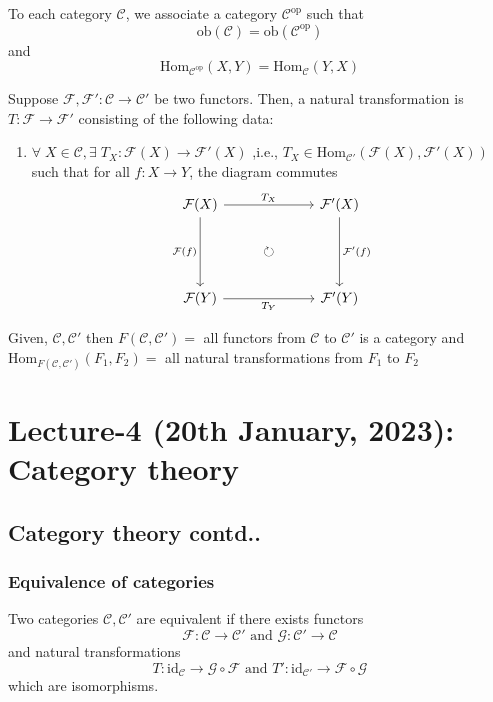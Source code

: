 \documentclass[oneside, 12pt]{scrbook}
\theoremstyle{theorem}
\begin{document}
To each category $\mathcal{C}$, we associate a category $\mathcal{C}^{\mathrm{op}}$ such that $$\mathrm{ob}(\mathcal{C}) = \mathrm{ob}(\mathcal{C}^{\mathrm{op}})$$ and $$\mathrm{Hom}_{\mathcal{C}^{\mathrm{op}}}(X,Y) = \mathrm{Hom}_{\mathcal{C}}(Y,X)$$

Suppose $\mathcal{F},\mathcal{F}' : \mathcal{C} \rightarrow \mathcal{C}'$ be two functors. Then, a natural transformation is $T: \mathcal{F} \rightarrow \mathcal{F}'$ consisting of the following data: 
\begin{enumerate}
\item $\forall \; X \in \mathcal{C} , \exists \; T_{X} : \mathcal{F}(X) \rightarrow \mathcal{F}'(X)$ ,i.e., $T_{X} \in \mathrm{Hom}_{\mathcal{C}'}(\mathcal{F}(X),\mathcal{F}' (X))$ such that for all $f: X \rightarrow Y$, the diagram commutes\[\begin{tikzcd}
	{\mathcal{F}(X)} & {} & {\mathcal{F}'(X)} \\
	{} & \circlearrowright & {} \\
	{\mathcal{F}(Y)} && {\mathcal{F}'(Y)}
	\arrow["{T_{X}}", from=1-1, to=1-3]
	\arrow["{\mathcal{F}(f)}"', from=1-1, to=3-1]
	\arrow["{\mathcal{F}'(f)}", from=1-3, to=3-3]
	\arrow["{T_{Y}}"', from=3-1, to=3-3]
\end{tikzcd}\]
\end{enumerate}

Given, $\mathcal{C}, \mathcal{C}'$ then $F(\mathcal{C}, \mathcal{C}')=$ all functors from $\mathcal{C}$ to $\mathcal{C}'$ is a category and $\mathrm{Hom}_{F(\mathcal{C}, \mathcal{C}')}(F_{1},F_{2})=$ all natural transformations from $F_{1}$ to $F_{2}$ 



\chapter{Lecture-4 (20th January, 2023): Category theory}


\section{Category theory contd..}
\subsection{Equivalence of categories}

Two categories $\mathcal{C},\mathcal{C}'$ are equivalent if there exists functors $$\mathcal{F}: \mathcal{C} \rightarrow \mathcal{C}'  \text{ and } \mathcal{G}: \mathcal{C}' \rightarrow \mathcal{C}$$ and natural transformations $$T : \mathrm{id}_{\mathcal{C}} \rightarrow \mathcal{G} \circ \mathcal{F} \text{ and } T' : \mathrm{id}_{\mathcal{C}'} \rightarrow \mathcal{F} \circ \mathcal{G}$$ which are isomorphisms.
\end{document}
